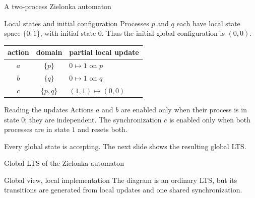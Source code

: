 \documentclass[t,11pt]{beamer}
\begin{document}
\begin{frame}{A two-process Zielonka automaton}
  \begin{block}{Local states and initial configuration}
    Processes $p$ and $q$ each have local state space $\{0,1\}$, with initial state $0$.
    Thus the initial global configuration is $(0,0)$.
  \end{block}
  \begin{center}
  \begin{tabular}{c|c|l}
    action & domain & partial local update\\ \hline
    $a$ & $\{p\}$ & $0\mapsto1$ on $p$\\
    $b$ & $\{q\}$ & $0\mapsto1$ on $q$\\
    $c$ & $\{p,q\}$ & $(1,1)\mapsto(0,0)$
  \end{tabular}
  \end{center}
  \begin{block}{Reading the updates}
    Actions $a$ and $b$ are enabled only when their process is in state $0$; they are independent.
    The synchronization $c$ is enabled only when both processes are in state $1$ and resets both.
  \end{block}
  Every global state is accepting. The next slide shows the resulting global LTS.
\end{frame}

\begin{frame}{Global LTS of the Zielonka automaton}
  \begin{center}
  \end{center}
  \begin{block}{Global view, local implementation}
    The diagram is an ordinary LTS, but its transitions are generated from local updates and one shared synchronization.
  \end{block}
\end{frame}
\end{document}

